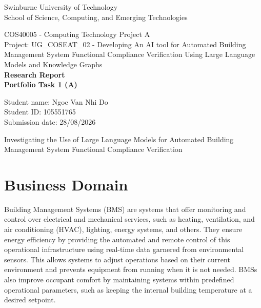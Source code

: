 \documentclass{article}
\begin{document}
\begin{titlepage}
\begin{center}
\vspace*{1cm}

Swinburne University of Technology \\
School of Science, Computing, and Emerging Technologies
\vspace{8cm}

COS40005 - Computing Technology Project A \\
Project: UG\_COSEAT\_02 - Developing An AI tool for Automated Building Management System Functional Compliance Verification Using Large Language Models and Knowledge Graphs \\
\vspace{1em}
\textbf{Research Report} \\
\textbf{Portfolio Task 1 (A)}
\vfill

Student name: Ngoc Van Nhi Do \\
Student ID: 105551765 \\
Submission date: 28/08/2026
\end{center}
\end{titlepage}

\pagestyle{fancy}
\fancyfoot{}
\renewcommand{\footrulewidth}{0.4pt} %
\fancyfoot[R]{\small\thepage}

\tableofcontents
\newpage

\begin{center}
\vspace*{2px}
{\Large
\setlength{\baselineskip}{2em}
Investigating the Use of Large Language Models for Automated Building Management System Functional Compliance Verification
}
\end{center}

\section{Business Domain}

Building Management Systems (BMS) are systems that offer monitoring and control over electrical and mechanical services, such as heating, ventilation, and air conditioning (HVAC), lighting, energy systems, and others. They ensure energy efficiency by providing the automated and remote control of this operational infrastructure using real-time data garnered from environmental sensors. This allows systems to adjust operations based on their current environment and prevents equipment from running when it is not needed. BMSs also improve occupant comfort by maintaining systems within predefined operational parameters, such as keeping the internal building temperature at a desired setpoint. 
\end{document}
